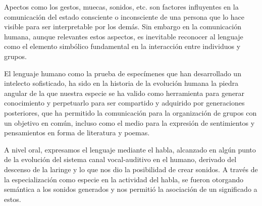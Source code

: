 \hfill \break
\justifying
Apectos como los gestos, muecas, sonidos, etc. son factores influyentes en la comunicación del estado consciente o inconsciente de una persona que lo hace visible para ser interpretable por los demás. Sin embargo en la comunicación humana, aunque relevantes estos aspectos, es inevitable reconocer al lenguaje como el elemento simbólico fundamental en la interacción entre individuos y grupos.

\hfill \break
\justifying
El lenguaje humano como la prueba de especímenes que han desarrollado un intelecto sofisticado, ha sido en la historia de la evolución humana la piedra angular de la que nuestra especie se ha valido como herramienta para generar conocimiento y perpetuarlo para ser compartido y adquirido por generaciones posteriores, que ha permitido la comunicación para la organización de grupos con un objetivo en común, incluso como el medio para la expresión de sentimientos y pensamientos en forma de literatura y poemas.

\hfill \break
\justifying
A nivel oral, expresamos el lenguaje mediante el habla, alcanzado en algún punto de la evolución del sistema canal vocal-auditivo en el humano, derivado del descenso de la laringe y lo que nos dio la posibilidad de crear sonidos. A través de la especialización como especie en la actividad del habla, se fueron otorgando semántica a los sonidos generados y nos permitió la asociación de un significado a estos.

